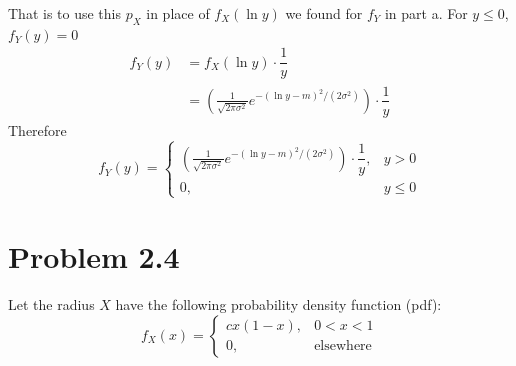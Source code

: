 \documentclass[11pt]{article}
\begin{document}
\begin{enumerate}[label=(\alph*)]
\begin{solution}
        That is to use this $p_X$ in place of $f_X(\ln{y})$ we found for $f_Y$ in part a.
        For $y \leq 0$, $f_Y(y) = 0$
        \begin{align*}
            f_Y(y) &= f_X(\ln{y}) \cdot \dfrac{1}{y} \\
            &= \left(\frac{1}{\sqrt{2\pi\sigma^2}} e^{-(\ln{y}-m)^2/(2\sigma^2)}\right) \cdot \dfrac{1}{y}
        \end{align*}
        Therefore
        \[
            f_Y(y) =
            \begin{cases}
                \left(\frac{1}{\sqrt{2\pi\sigma^2}} e^{-(\ln{y}-m)^2/(2\sigma^2)}\right) \cdot \dfrac{1}{y}, & y > 0 \\
                0, & y \leq 0
            \end{cases}
        \]
    \end{solution}

    \vspace{5em}

\end{enumerate}

\newpage
\section*{Problem 2.4}
Let the radius $X$ have the following probability density function (pdf):
\[
    f_X(x) =
    \begin{cases}
        cx(1-x), & 0 < x < 1 \\
        0, & \text{elsewhere}
    \end{cases}
\]
\end{document}
